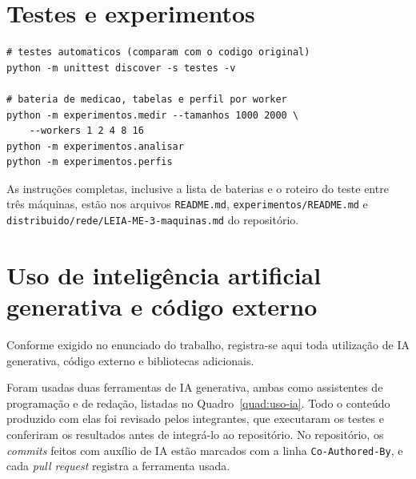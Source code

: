\section{Testes e experimentos}

{\small
\begin{verbatim}
# testes automaticos (comparam com o codigo original)
python -m unittest discover -s testes -v

# bateria de medicao, tabelas e perfil por worker
python -m experimentos.medir --tamanhos 1000 2000 \
    --workers 1 2 4 8 16
python -m experimentos.analisar
python -m experimentos.perfis
\end{verbatim}
}

As instruções completas, inclusive a lista de baterias e o roteiro do teste entre três máquinas, estão nos arquivos \texttt{README.md}, \texttt{experimentos/README.md} e \texttt{distribuido/rede/LEIA-ME-3-maquinas.md} do repositório.

\section{Uso de inteligência artificial generativa e código externo}

Conforme exigido no enunciado do trabalho, registra-se aqui toda utilização de IA generativa, código externo e bibliotecas adicionais.

Foram usadas duas ferramentas de IA generativa, ambas como assistentes de programação e de redação, listadas no Quadro~\ref{quad:uso-ia}. Todo o conteúdo produzido com elas foi revisado pelos integrantes, que executaram os testes e conferiram os resultados antes de integrá-lo ao repositório. No repositório, os \textit{commits} feitos com auxílio de IA estão marcados com a linha \texttt{Co-Authored-By}, e cada \textit{pull request} registra a ferramenta usada.

